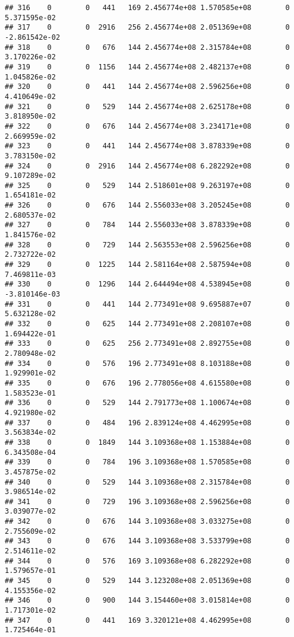 \documentclass[
]{article}
\begin{document}
\begin{enumerate}
\begin{verbatim}
## 316    0        0   441   169 2.456774e+08 1.570585e+08        0  5.371595e-02
## 317    0        0  2916   256 2.456774e+08 2.051369e+08        0 -2.861542e-02
## 318    0        0   676   144 2.456774e+08 2.315784e+08        0  3.170226e-02
## 319    0        0  1156   144 2.456774e+08 2.482137e+08        0  1.045826e-02
## 320    0        0   441   144 2.456774e+08 2.596256e+08        0  4.410649e-02
## 321    0        0   529   144 2.456774e+08 2.625178e+08        0  3.818950e-02
## 322    0        0   676   144 2.456774e+08 3.234171e+08        0  2.669959e-02
## 323    0        0   441   144 2.456774e+08 3.878339e+08        0  3.783150e-02
## 324    0        0  2916   144 2.456774e+08 6.282292e+08        0  9.107289e-02
## 325    0        0   529   144 2.518601e+08 9.263197e+08        0  1.654181e-02
## 326    0        0   676   144 2.556033e+08 3.205245e+08        0  2.680537e-02
## 327    0        0   784   144 2.556033e+08 3.878339e+08        0  1.841576e-02
## 328    0        0   729   144 2.563553e+08 2.596256e+08        0  2.732722e-02
## 329    0        0  1225   144 2.581164e+08 2.587594e+08        0  7.469811e-03
## 330    0        0  1296   144 2.644494e+08 4.538945e+08        0 -3.810146e-03
## 331    0        0   441   144 2.773491e+08 9.695887e+07        0  5.632128e-02
## 332    0        0   625   144 2.773491e+08 2.208107e+08        0  1.694422e-01
## 333    0        0   625   256 2.773491e+08 2.892755e+08        0  2.780948e-02
## 334    0        0   576   196 2.773491e+08 8.103188e+08        0  1.929901e-02
## 335    0        0   676   196 2.778056e+08 4.615580e+08        0  1.583523e-01
## 336    0        0   529   144 2.791773e+08 1.100674e+08        0  4.921980e-02
## 337    0        0   484   196 2.839124e+08 4.462995e+08        0  3.563834e-02
## 338    0        0  1849   144 3.109368e+08 1.153884e+08        0  6.343508e-04
## 339    0        0   784   196 3.109368e+08 1.570585e+08        0  3.457875e-02
## 340    0        0   529   144 3.109368e+08 2.315784e+08        0  3.986514e-02
## 341    0        0   729   196 3.109368e+08 2.596256e+08        0  3.039077e-02
## 342    0        0   676   144 3.109368e+08 3.033275e+08        0  2.755609e-02
## 343    0        0   676   144 3.109368e+08 3.533799e+08        0  2.514611e-02
## 344    0        0   576   169 3.109368e+08 6.282292e+08        0  1.579657e-01
## 345    0        0   529   144 3.123208e+08 2.051369e+08        0  4.155356e-02
## 346    0        0   900   144 3.154460e+08 3.015814e+08        0  1.717301e-02
## 347    0        0   441   169 3.320121e+08 4.462995e+08        0  1.725464e-01

\end{verbatim}
\end{enumerate}
\end{document}
